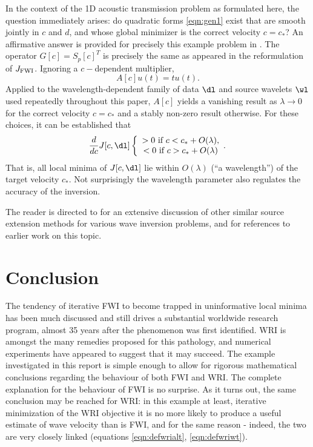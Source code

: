In the context of the 1D acoustic transmission problem as formulated
here, the question immediately arises: do quadratic forms \ref{eqn:gen1}
exist that are smooth jointly in $c$ and $d$, and whose global
minimizer is the correct velocity $c=c_*$? An affirmative answer is
provided for precisely this example problem in
\cite[]{wwsorcas:19-02}. The operator $G[c]=S_p[c]^T$ is precisely the
same as appeared in the reformulation of $J_{\rm FWI}$. Ignoring a
$c-$dependent multiplier,
\[
  A[c]u(t) = tu(t).
\]
Applied to the wavelength-dependent family of data $\dl$ and source
wavelets $\wl$ used repeatedly throughout this paper, $A[c]$ yields a
vanishing result as $\lambda \rightarrow 0$ for the correct velocity
$c=c_*$ and a stably non-zero result otherwise. For these choices, it
can be established that
\[
  \frac{d}{dc}J[c,\dl]
  \left\{\begin{array}{c}
           > 0 \mbox{ if }c<c_*+O(\lambda),\\
           < 0 \mbox{ if }c>c_*+O(\lambda)
         \end{array}.
       \right.
     \]
That is, all local minima of $J[c,\dl]$ lie within $O(\lambda)$ (``a
wavelength'') of the target velocity $c_*$. Not surprisingly the
wavelength parameter also regulates the accuracy of the inversion.

The reader is directed to \cite[]{HuangNammourSymesDollizal:SEG19} for
an extensive discussion of other similar source extension methods for
various wave inversion problems, and for
references to earlier work on this topic.

\section{Conclusion}
The tendency of iterative FWI to become trapped in uninformative local
minima has been much discussed and still drives a substantial
worldwide research program, almost 35 years after the phenomenon was
first identified. WRI is amongst the many remedies proposed for this
pathology, and numerical experiments have appeared to suggest that it
may succeed. The example investigated in this report is simple enough
to allow for rigorous mathematical conclusions regarding the behaviour
of both FWI and WRI. The complete explanation for the behaviour of FWI
is no surprise. As it turns out, the same conclusion may be reached
for WRI: in this example at least, iterative minimization of the WRI
objective it is no more likely to produce a useful estimate of wave
velocity than is FWI, and for the same reason - indeed, the two are
very closely linked (equations \ref{eqn:defwrialt},
\ref{eqn:defwriwt}).

